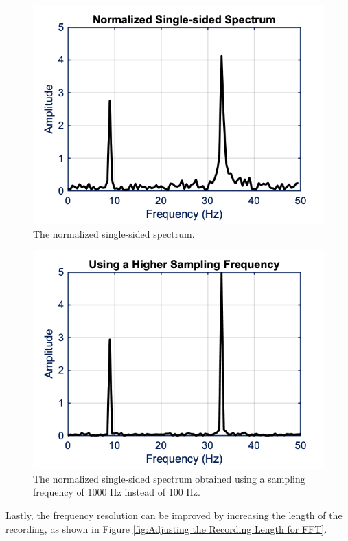 \begin{figure}[H]
    \centering
    \includegraphics[width = 4 in]{Chapters/Signal Processing/Figures/Normalized Single-sided Spectrum.png}
    \caption{The normalized single-sided spectrum.}
    \label{fig:Normalized Single-sided Spectrum}
\end{figure}

\begin{figure}[H]
    \centering
    \includegraphics[width = 4 in]{Chapters/Signal Processing/Figures/Using a Higher Sampling Frequency.png}
    \caption{The normalized single-sided spectrum obtained using a sampling frequency of 1000 Hz instead of 100 Hz.}
    \label{fig:FFT Using a Higher Sampling Frequency}
\end{figure}

Lastly, the frequency resolution can be improved by increasing the length of the recording, as shown in Figure \ref{fig:Adjusting the Recording Length for FFT}.

